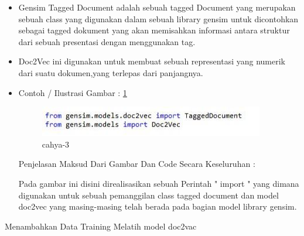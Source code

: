 \begin{itemize}
\item Gensim Tagged Document adalah sebuah tagged Document yang merupakan sebuah class yang digunakan dalam sebuah library gensim untuk dicontohkan sebagai tagged dokument yang akan memisahkan informasi antara struktur dari sebuah presentasi dengan menggunakan tag.
\item Doc2Vec ini digunakan untuk membuat sebuah representasi yang numerik dari suatu dokumen,yang terlepas dari panjangnya. 
\item Contoh / Ilustrasi Gambar : \ref{cahya-3}
\par
\begin{figure}[!hbtp]
\centering
\includegraphics[scale=0.3]{figures/cahya-3.jpg}
\caption{cahya-3}
\label{cahya-3}
\end{figure}
\par
\par Penjelasan  Maksud Dari Gambar Dan Code Secara Keseluruhan  : 
\par Pada gambar ini disini direalisasikan sebuah Perintah " import " yang dimana digunakan untuk sebuah pemanggilan class tagged document dan model doc2vec yang masing-masing telah  berada pada bagian model library gensim.
\par
\end{itemize}
\item Menambahkan Data Training  Melatih model doc2vac 
